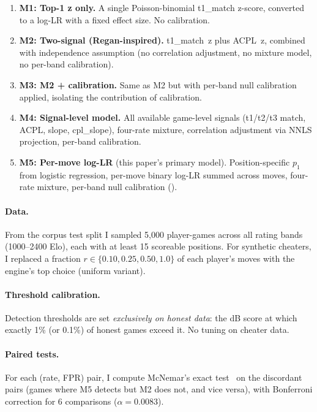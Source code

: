 \documentclass[11pt,a4paper]{article}
\theoremstyle{definition}
\begin{document}
\begin{enumerate}[nosep]
  \item \textbf{M1: Top-1 z only.} A single Poisson-binomial
    t1\_match z-score, converted to a log-LR with a fixed effect
    size.  No calibration.
  \item \textbf{M2: Two-signal (Regan-inspired).} t1\_match~z plus ACPL~z,
    combined with independence assumption (no correlation
    adjustment, no mixture model, no per-band calibration).
  \item \textbf{M3: M2 + calibration.} Same as M2 but with
    per-band null calibration applied, isolating the contribution
    of calibration.
  \item \textbf{M4: Signal-level model.} All available game-level
    signals (t1/t2/t3 match, ACPL, slope, cpl\_slope), four-rate
    mixture, correlation adjustment via NNLS projection, per-band
    calibration.
  \item \textbf{M5: Per-move log-LR} (this paper's primary model).
    Position-specific $p_1$ from logistic regression, per-move binary
    log-LR summed across moves, four-rate mixture, per-band null
    calibration ().
\end{enumerate}

\paragraph{Data.}
From the corpus test split I sampled 5{,}000 player-games across
all rating bands (1000--2400 Elo), each with at least 15 scoreable
positions.  For synthetic cheaters, I replaced a fraction
$r \in \{0.10, 0.25, 0.50, 1.0\}$ of each player's moves with the
engine's top choice (uniform variant).

\paragraph{Threshold calibration.}
Detection thresholds are set \emph{exclusively on honest data}:
the dB score at which exactly 1\% (or 0.1\%) of honest games
exceed it.  No tuning on cheater data.

\paragraph{Paired tests.}
For each (rate, FPR) pair, I compute McNemar's exact
test~\citep{mcnemar1947note} on the discordant pairs (games where M5 detects but M2 does not, and vice
versa), with Bonferroni correction for 6 comparisons
($\alpha = 0.0083$).
\end{document}
